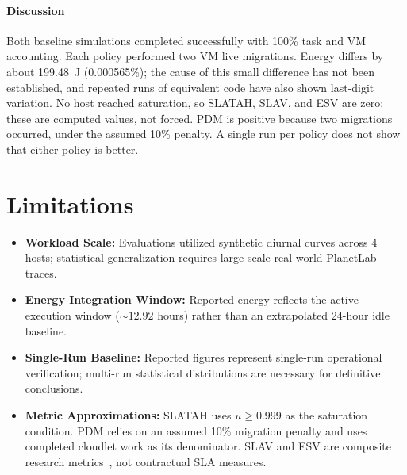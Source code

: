 \documentclass[11pt,a4paper]{article}
\begin{document}
\paragraph{Discussion}
Both baseline simulations completed successfully with 100\% task and VM accounting. Each policy performed two VM live migrations. Energy differs by about 199.48~J (0.000565\%); the cause of this small difference has not been established, and repeated runs of equivalent code have also shown last-digit variation. No host reached saturation, so SLATAH, SLAV, and ESV are zero; these are computed values, not forced. PDM is positive because two migrations occurred, under the assumed 10\% penalty. A single run per policy does not show that either policy is better.

\section{Limitations}
\begin{itemize}[leftmargin=1.8em, itemsep=2pt]
  \item \textbf{Workload Scale:} Evaluations utilized synthetic diurnal curves across 4 hosts; statistical generalization requires large-scale real-world PlanetLab traces.
  \item \textbf{Energy Integration Window:} Reported energy reflects the active execution window ($\sim 12.92$ hours) rather than an extrapolated 24-hour idle baseline.
  \item \textbf{Single-Run Baseline:} Reported figures represent single-run operational verification; multi-run statistical distributions are necessary for definitive conclusions.
  \item \textbf{Metric Approximations:} SLATAH uses $u \ge 0.999$ as the saturation condition. PDM relies on an assumed 10\% migration penalty and uses completed cloudlet work as its denominator. SLAV and ESV are composite research metrics~\cite{beloglazov2012ccpe}, not contractual SLA measures.
\end{itemize}
\end{document}
